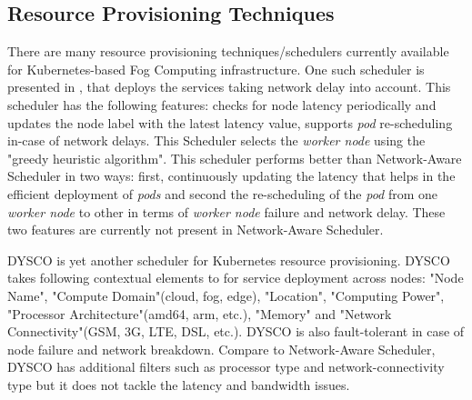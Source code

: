 \subsection{Resource Provisioning Techniques}
There are many resource provisioning techniques/schedulers currently available for Kubernetes-based Fog Computing infrastructure. One such scheduler is presented in \cite{Haja2019}, that deploys the services taking network delay into account. This scheduler\cite{Haja2019} has the following features: checks for node latency periodically and updates the node label with the latest latency value, supports \emph{pod} re-scheduling in-case of network delays. This Scheduler\cite{Haja2019} selects the \emph{worker node} using the "greedy heuristic algorithm". This scheduler\cite{Haja2019} performs better than Network-Aware Scheduler\cite{Santos2019} in two ways: first, continuously updating the latency that helps in the efficient deployment of \emph{pods} and second the re-scheduling of the \emph{pod} from one \emph{worker node} to other in terms of \emph{worker node} failure and network delay. These two features are currently not present in Network-Aware Scheduler. \par
DYSCO\cite{Mittermeier2018} is yet another scheduler for Kubernetes resource provisioning. DYSCO takes following contextual elements to for service deployment across nodes\cite{Mittermeier2018}: "Node Name", "Compute Domain"(cloud, fog, edge), "Location", "Computing Power", "Processor Architecture"(amd64, arm, etc.), "Memory" and "Network Connectivity"(GSM, 3G, LTE, DSL, etc.). DYSCO is also fault-tolerant in case of node failure and network breakdown\cite{Mittermeier2018}. Compare to Network-Aware Scheduler\cite{Santos2019}, DYSCO has additional filters such as processor type and network-connectivity type but it does not tackle the latency and bandwidth issues. \par
